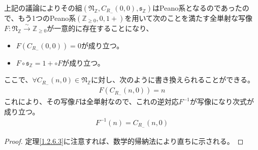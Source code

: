\documentclass[dvipdfmx]{jsarticle}
\begin{document}
\begin{thm}\label{1.2.6.4}
上記の議論によりその組$\left( \mathfrak{N}_{\mathbb{Z}},C_{R_{-}}(0,0),\mathfrak{s}_{\mathbb{Z}} \right)$はPeano系となるのであったので、もう1つのPeano系$\left( \mathbb{Z}_{\geq 0},0,1 + \right)$を用いて次のことを満たす全単射な写像$F:\mathfrak{N}_{\mathbb{Z}}\overset{\sim}{\rightarrow}\mathbb{Z}_{\geq 0}$が一意的に存在することになり、
\begin{itemize}
\item
  $F\left( C_{R_{-}}(0,0) \right) = 0$が成り立つ。
\item
  $F \circ \mathfrak{s}_{\mathbb{Z}} = 1 + \circ F$が成り立つ。
\end{itemize}
ここで、$\forall C_{R_{-}}(n,0) \in \mathfrak{N}_{\mathbb{Z}}$に対し、次のように書き換えられることができる。
\begin{align*}
F\left( C_{R_{-}}(n,0) \right) = n
\end{align*}
これにより、その写像$F$は全単射なので、これの逆対応$F^{- 1}$が写像になり次式が成り立つ。
\begin{align*}
F^{- 1}(n) = C_{R_{-}}(n,0)
\end{align*}
\end{thm}
\begin{proof}
定理\ref{1.2.6.3}に注意すれば、数学的帰納法により直ちに示される。
\end{proof}
\end{document}
